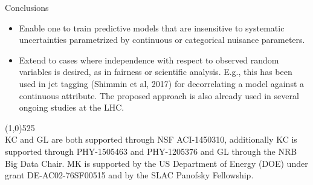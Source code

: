 \documentclass[final,unknownkeysallowed]{beamer}
\newcommand{\cmark}{\ding{51}}%
\begin{document}
\begin{frame}{}
\begin{textblock}{0.32}
\begin{block}{Conclusions \phantom{p}}
\begin{itemize}
\item[{\color{green} \cmark}] Enable one to train predictive models that are insensitive to systematic uncertainties parametrized by continuous or categorical nuisance parameters.

\item[{\color{green} \cmark}] Extend to cases where independence with respect to
observed random variables is desired, {\color{red}as in fairness or scientific analysis}.
E.g., this has been used in jet tagging (Shimmin et al, 2017) for decorrelating a model against a {\color{red} continuous} attribute. The proposed approach is also {\color{red} already used in several ongoing studies at the LHC}.
\end{itemize}


\vspace{-0.7cm}
\line(1,0){525}\\
KC and GL are both supported through NSF ACI-1450310, additionally KC is supported through PHY-1505463 and PHY-1205376 and GL through the NRB Big Data Chair. MK is supported by the US Department of Energy (DOE) under grant DE-AC02-76SF00515 and by the SLAC Panofsky Fellowship.
\end{block}




\end{textblock}




\end{frame}
\end{document}
